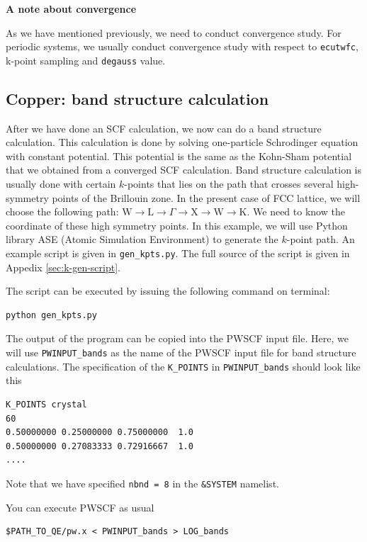 \documentclass[12pt,english]{paper}
\begin{document}
\textbf{A note about convergence}

As we have mentioned previously, we need to conduct convergence study.
For periodic systems, we usually conduct convergence study with respect
to \texttt{ecutwfc}, k-point sampling and \texttt{degauss} value.


\subsection{Copper: band structure calculation}

After we have done an SCF calculation, we now can do a band structure
calculation. This calculation is done by solving one-particle Schrodinger
equation with constant potential. This potential is the same as the
Kohn-Sham potential that we obtained from a converged SCF calculation.
Band structure calculation is usually done with certain $k$-points
that lies on the path that crosses several high-symmetry points of
the Brillouin zone. In the present case of FCC lattice, we will choose
the following path: $\mathrm{W}\rightarrow\mathrm{L}\rightarrow\Gamma\rightarrow\mathrm{X}\rightarrow\mathrm{W}\rightarrow\mathrm{K}$.
We need to know the coordinate of these high symmetry points. In this
example, we will use Python library ASE (Atomic Simulation Environment)
\cite{Bahn2002} to generate the $k$-point path. An example script
is given in \texttt{gen\_kpts.py}. The full source of the script is
given in Appedix \ref{sec:k-gen-script}.

The script can be executed by issuing the following command on terminal:

\begin{lstlisting}
python gen_kpts.py
\end{lstlisting}


The output of the program can be copied into the PWSCF input file.
Here, we will use \texttt{PWINPUT\_bands} as the name of the PWSCF
input file for band structure calculations. The specification of the
\texttt{K\_POINTS} in \texttt{PWINPUT\_bands} should look like this

\begin{lstlisting}
K_POINTS crystal
60
0.50000000 0.25000000 0.75000000  1.0
0.50000000 0.27083333 0.72916667  1.0
....
\end{lstlisting}
Note that we have specified \texttt{nbnd = 8} in the \texttt{\&SYSTEM}
namelist.

You can execute PWSCF as usual

\begin{lstlisting}
$PATH_TO_QE/pw.x < PWINPUT_bands > LOG_bands
\end{lstlisting}
\end{document}
